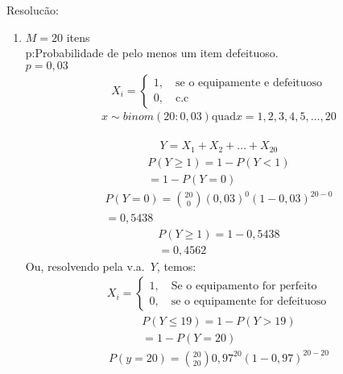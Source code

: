 \begin{description}
    \item{Resolucão:}
      \begin{enumerate}[label=(\alph*)]
        \item    $M=20$ itens\\
          p:Probabilidade de pelo menos um item defeituoso.\\
          $p=0,03$
          \begin{align*}
           X_i= \begin{cases}
             1, \quad \text{se o equipamente e defeituoso}\\
             0, \quad \text{c.c }
            \end{cases} 
          \end{align*}
          $$x \sim binom(20:0,03) \text{quad} x=1,2,3,4,5,\dots,20$$\\
          \begin{align*}
           Y=X_1 + X_2 + \ldots +X_20 
          \end{align*}
          \begin{align*}
            P(Y\ge 1)= 1-P(Y<1)\\
            =1-P(Y=0)
          \end{align*}
          \begin{align*}
            P(Y=0)= \binom{20}{0} (0,03)^0 (1-0,03)^{20-0}\\
            =0,5438
          \end{align*}
          \begin{align*}
            P(Y\ge 1)= 1-0,5438\\
            =0,4562
          \end{align*}
          Ou, resolvendo pela v.a.\ $Y$, temos:
\begin{align*}
           X_i= \begin{cases}
             1, \quad \text{Se o equipamento for perfeito} \\
             0, \quad \text{se o equipamente for defeituoso}
            \end{cases} 
          \end{align*}
          \begin{align*}
            P(Y\le 19)=1-P(Y>19)\\
            =1-P(Y=20)
          \end{align*}
          \begin{align*}
            P(y=20)=\binom{20}{20}0,97^{20}(1-0,97)^{20-20}\\

\end{align*}
\end{enumerate}
\end{description}
